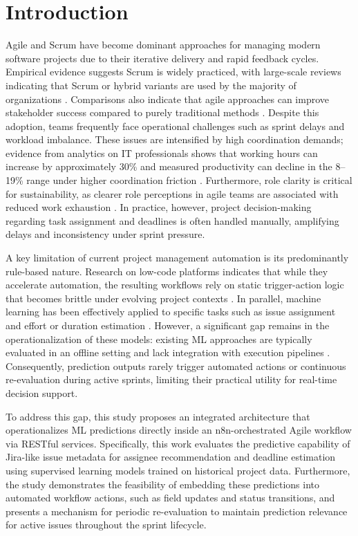 \documentclass[conference]{IEEEtran}
\begin{document}
\section{Introduction}
Agile and Scrum have become dominant approaches for managing modern software projects due to their iterative delivery and rapid feedback cycles. Empirical evidence suggests Scrum is widely practiced, with large-scale reviews indicating that Scrum or hybrid variants are used by the majority of organizations \cite{verwijs2023_scrum}. Comparisons also indicate that agile approaches can improve stakeholder success compared to purely traditional methods \cite{gemino2021_project_success}. Despite this adoption, teams frequently face operational challenges such as sprint delays and workload imbalance. These issues are intensified by high coordination demands; evidence from analytics on IT professionals shows that working hours can increase by approximately 30\% and measured productivity can decline in the 8--19\% range under higher coordination friction \cite{gibbs2023_wfh_productivity}. Furthermore, role clarity is critical for sustainability, as clearer role perceptions in agile teams are associated with reduced work exhaustion \cite{venkatesh2020_work_exhaustion}. In practice, however, project decision-making regarding task assignment and deadlines is often handled manually, amplifying delays and inconsistency under sprint pressure.

A key limitation of current project management automation is its predominantly rule-based nature. Research on low-code platforms indicates that while they accelerate automation, the resulting workflows rely on static trigger-action logic that becomes brittle under evolving project contexts \cite{prinz2021_lowcode_slr, zhao2021_trigger_action}. In parallel, machine learning has been effectively applied to specific tasks such as issue assignment \cite{diamantopoulos2023_issue_assignment} and effort or duration estimation \cite{sousa2023_task_effort}. However, a significant gap remains in the operationalization of these models: existing ML approaches are typically evaluated in an offline setting \cite{mahdi2021_spm_slr, cabral2023_ensemble_effort} and lack integration with execution pipelines \cite{yasmin2024_airflow_wac}. Consequently, prediction outputs rarely trigger automated actions or continuous re-evaluation during active sprints, limiting their practical utility for real-time decision support.

To address this gap, this study proposes an integrated architecture that operationalizes ML predictions directly inside an n8n-orchestrated Agile workflow via RESTful services. Specifically, this work evaluates the predictive capability of Jira-like issue metadata for assignee recommendation and deadline estimation using supervised learning models trained on historical project data. Furthermore, the study demonstrates the feasibility of embedding these predictions into automated workflow actions, such as field updates and status transitions, and presents a mechanism for periodic re-evaluation to maintain prediction relevance for active issues throughout the sprint lifecycle.
\end{document}
